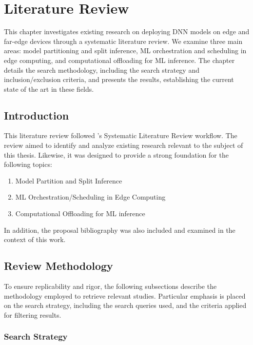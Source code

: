 \chapter{Literature Review} \label{chap:ch2}

This chapter investigates existing research on deploying \ac{DNN} models 
on edge and far-edge devices through a systematic literature review. We 
examine three main areas: model partitioning and split inference, \ac{ML} 
orchestration and scheduling in edge computing, and computational offloading 
for \ac{ML} inference. The chapter details the search methodology, including the
search strategy and inclusion/exclusion criteria, and 
presents the results, establishing the current state of the art in these fields.


\section{Introduction}\label{sec:se21}

This literature review followed \textcite{Kitchenham2009}'s 
Systematic Literature Review workflow.
The review aimed to identify and analyze existing research relevant to the
subject of this thesis. Likewise, it was designed to provide
a strong foundation for the following topics:

\begin{enumerate}
    \item Model Partition and Split Inference
    \item \ac{ML} Orchestration/Scheduling in Edge Computing
    \item Computational Offloading for \ac{ML} inference
\end{enumerate}

In addition, the proposal bibliography was also
included and examined in the context of this work.


\section{Review Methodology}\label{sec:se22}

To ensure replicability and rigor, the following subsections describe the 
methodology employed to retrieve relevant studies. Particular emphasis is 
placed on the search strategy, including the search queries used, and the 
criteria applied for filtering results.


\subsection{Search Strategy} \label{sec:se221}

